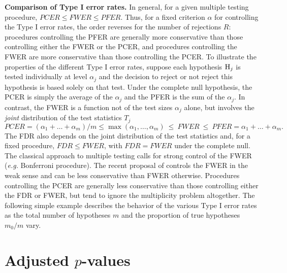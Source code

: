\documentclass[11pt]{article}
\begin{document}

{\bf Comparison of Type I error rates.} In general, for a given
multiple testing procedure, $PCER \leq FWER \leq PFER$. Thus, for a
fixed criterion $\alpha$ for controlling the Type I error rates, the
order reverses for the number of rejections $R$: procedures
controlling the PFER are generally more conservative than those
controlling either the FWER or the PCER, and procedures controlling
the FWER are more conservative than those controlling the PCER. To illustrate the properties
of the different Type I error rates, suppose each hypothesis ${\rm
  H}_j$ is tested individually at level $\alpha_j$ and the decision to
reject or not reject this hypothesis is based solely on that test. Under the complete null hypothesis, the PCER is simply the average of the $\alpha_j$ and the PFER is the sum of the $\alpha_j$. In contrast, the FWER is a function not of the test sizes $\alpha_j$ alone, but involves the {\it joint} distribution of the test statistics $T_j$ 
$$PCER = (\alpha_1 + \ldots + \alpha_m)/m \leq \max( \alpha_1, \ldots, \alpha_m) \ \leq \ FWER \ \leq \ PFER = \alpha_1 + \ldots + \alpha_m.$$
The FDR also depends on the joint distribution of the test statistics and, for a fixed procedure, $FDR \leq FWER$, with $FDR = FWER$ under the complete null. The classical approach to multiple testing calls for strong control of the FWER ({\it e.g.} Bonferroni procedure). The recent proposal of \cite{Benjamini&Hochberg95} controls the FWER in the weak sense and can be less conservative than FWER otherwise. Procedures controlling the PCER are generally less conservative than those controlling either the FDR or FWER, but tend to ignore the multiplicity problem altogether. The following simple example describes the behavior of the various Type I error rates as the total number of hypotheses $m$ and the proportion of true hypotheses $m_0/m$ vary.

\section{Adjusted $p$-values}\label{sadjp}
\end{document}

